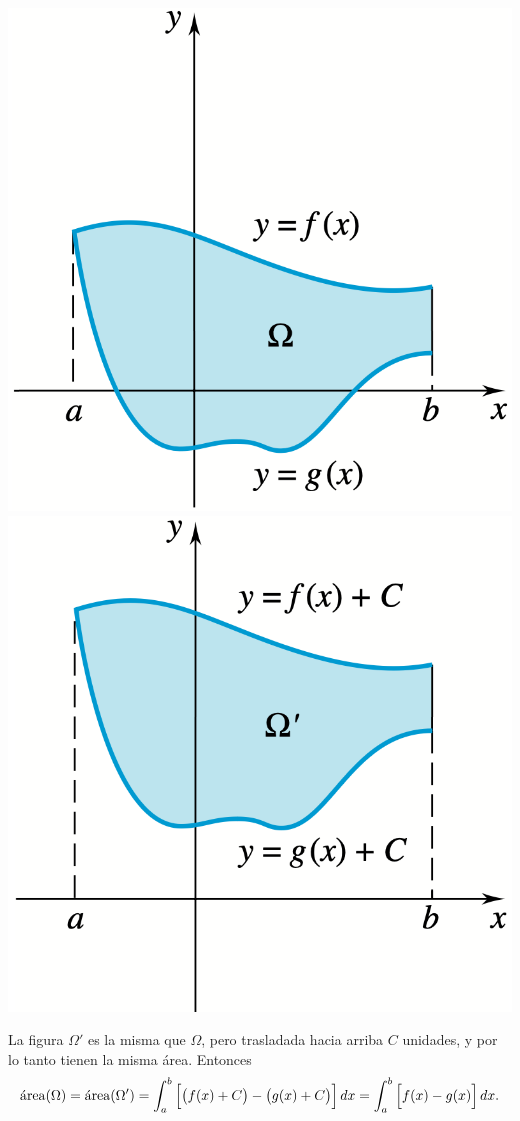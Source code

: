   \begin{center}
    \includegraphics[width=.4\textwidth]{pics/areas-4a.png}
    \hfil
    \includegraphics[width=.4\textwidth]{pics/areas-4b.png}
  \end{center}

  La figura $\Omega'$ es la misma que $\Omega$, pero trasladada hacia arriba $C$ unidades, y por lo tanto tienen la misma área. Entonces
  \[
  \mathrm{\protect\acute{a}rea}(\Omega)=\mathrm{\protect\acute{a}rea}(\Omega')
  =\int_a^b \Big[\big(f(x)+C\big)-\big(g(x)+C\big)\Big]\,dx
  =\int_a^b \Big[f(x)-g(x)\Big]\,dx.
  \]

